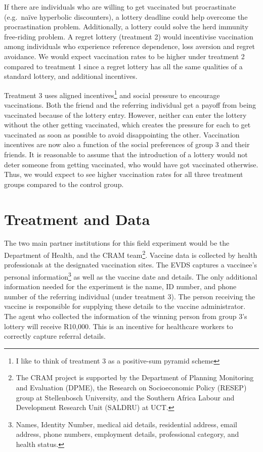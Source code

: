 \documentclass[11pt,preprint, authoryear]{elsarticle}
\numberwithin{equation}{section}
\numberwithin{figure}{section}
\numberwithin{table}{section}
\let\rmarkdownfootnote\footnote%
\def\footnote{\protect\rmarkdownfootnote}
\begin{document}
If there are individuals who are willing to get vaccinated but
procrastinate (e.g.~naïve hyperbolic discounters), a lottery deadline
could help overcome the procrastination problem. Additionally, a lottery
could solve the herd immunity free-riding problem. A regret lottery
(treatment 2) would incentivise vaccination among individuals who
experience reference dependence, loss aversion and regret avoidance. We
would expect vaccination rates to be higher under treatment 2 compared
to treatment 1 since a regret lottery has all the same qualities of a
standard lottery, and additional incentives.

Treatment 3 uses aligned incentives\footnote{I like to think of
  treatment 3 as a positive-sum pyramid scheme} and social pressure to
encourage vaccinations. Both the friend and the referring individual get
a payoff from being vaccinated because of the lottery entry. However,
neither can enter the lottery without the other getting vaccinated,
which creates the pressure for each to get vaccinated as soon as
possible to avoid disappointing the other. Vaccination incentives are
now also a function of the social preferences of group 3 and their
friends. It is reasonable to assume that the introduction of a lottery
would not deter someone from getting vaccinated, who would have got
vaccinated otherwise. Thus, we would expect to see higher vaccination
rates for all three treatment groups compared to the control group.

\hypertarget{treatment-and-data}{%
\section{\texorpdfstring{Treatment and Data
\label{treatment}}{Treatment and Data }}\label{treatment-and-data}}

The two main partner institutions for this field experiment would be the
Department of Health, and the CRAM team\footnote{The CRAM project is
  supported by the Department of Planning Monitoring and Evaluation
  (DPME), the Research on Socioeconomic Policy (RESEP) group at
  Stellenbosch University, and the Southern Africa Labour and
  Development Research Unit (SALDRU) at UCT.}. Vaccine data is collected
by health professionals at the designated vaccination sites. The EVDS
captures a vaccinee's personal information\footnote{Names, Identity
  Number, medical aid details, residential address, email address, phone
  numbers, employment details, professional category, and health status.}
as well as the vaccine date and details. The only additional information
needed for the experiment is the name, ID number, and phone number of
the referring individual (under treatment 3). The person receiving the
vaccine is responsible for supplying these details to the vaccine
administrator. The agent who collected the information of the winning
person from group 3's lottery will receive R10,000. This is an incentive
for healthcare workers to correctly capture referral details.
\end{document}
